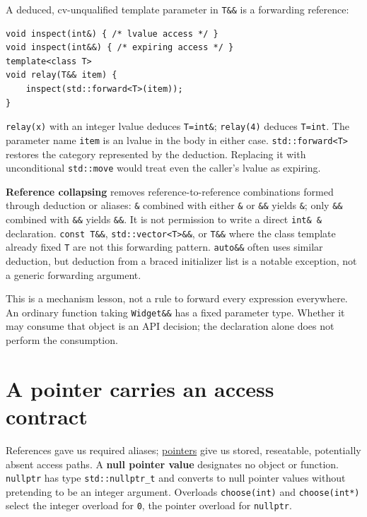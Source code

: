 A deduced, cv-unqualified template parameter in \texttt{T\&\&} is a forwarding reference:

\begin{verbatim}
void inspect(int&) { /* lvalue access */ }
void inspect(int&&) { /* expiring access */ }
template<class T>
void relay(T&& item) {
    inspect(std::forward<T>(item));
}
\end{verbatim}

\texttt{relay(x)} with an integer lvalue deduces \texttt{T=int\&}; \texttt{relay(4)} deduces \texttt{T=int}. The parameter name \texttt{item} is an lvalue in the body in either case. \texttt{std::forward\textless{}T\textgreater{}} restores the category represented by the deduction. Replacing it with unconditional \texttt{std::move} would treat even the caller's lvalue as expiring.

\textbf{Reference collapsing} removes reference-to-reference combinations formed through deduction or aliases: \texttt{\&} combined with either \texttt{\&} or \texttt{\&\&} yields \texttt{\&}; only \texttt{\&\&} combined with \texttt{\&\&} yields \texttt{\&\&}. It is not permission to write a direct \texttt{int\&\ \&} declaration. \texttt{const\ T\&\&}, \texttt{std::vector\textless{}T\textgreater{}\&\&}, or \texttt{T\&\&} where the class template already fixed \texttt{T} are not this forwarding pattern. \texttt{auto\&\&} often uses similar deduction, but deduction from a braced initializer list is a notable exception, not a generic forwarding argument.

This is a mechanism lesson, not a rule to forward every expression everywhere. An ordinary function taking \texttt{Widget\&\&} has a fixed parameter type. Whether it may consume that object is an API decision; the declaration alone does not perform the consumption.

\section{A pointer carries an access contract}\label{05-engine-i-ch003-a-pointer-carries-an-access-contract}

References gave us required aliases; \hyperref[appendix-afae48c31800]{pointers} give us stored, reseatable, potentially absent access paths. A \textbf{null pointer value} designates no object or function. \texttt{nullptr} has type \texttt{std::nullptr\_t} and converts to null pointer values without pretending to be an integer argument. Overloads \texttt{choose(int)} and \texttt{choose(int*)} select the integer overload for \texttt{0}, the pointer overload for \texttt{nullptr}.

